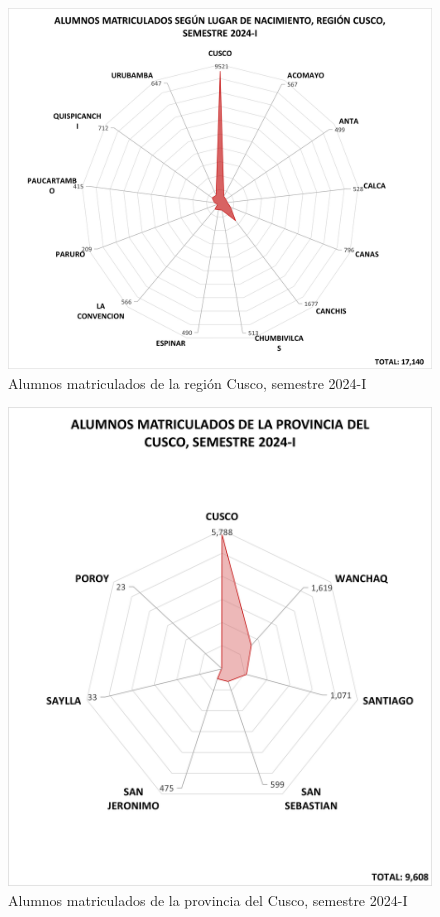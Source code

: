 \documentclass[
  12pt,
  letterpaper,
]{scrreprt}
\begin{document}
\begin{figure}[H]

\caption{Alumnos matriculados de la región Cusco, semestre 2024-I}

{\centering \includegraphics[width=0.6\linewidth,height=\textheight,keepaspectratio]{imagen/imagen8.png}

}

\end{figure}%
\begin{figure}[H]

\caption{Alumnos matriculados de la provincia del Cusco, semestre
2024-I}

{\centering \includegraphics[width=0.6\linewidth,height=\textheight,keepaspectratio]{imagen/imagen7.png}

}

\end{figure}%
\end{document}
